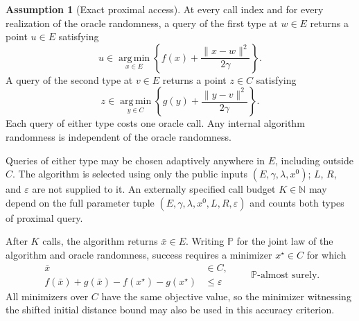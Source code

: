 \documentclass[10pt]{article}
\theoremstyle{definition}
\newtheorem{assumption}{Assumption}
\begin{document}
\begin{assumption}[Exact proximal access]
At every call index and for every realization of the oracle randomness, a query of the first type at $w\in E$ returns a point $u\in E$ satisfying
\[
u\in\operatorname*{arg\,min}_{x\in E}
\left\{f(x)+\frac{\|x-w\|^2}{2\gamma}\right\}.
\]
A query of the second type at $v\in E$ returns a point $z\in C$ satisfying
\[
z\in\operatorname*{arg\,min}_{y\in C}
\left\{g(y)+\frac{\|y-v\|^2}{2\gamma}\right\}.
\]
Each query of either type costs one oracle call. Any internal algorithm randomness is independent of the oracle randomness.
\end{assumption}

Queries of either type may be chosen adaptively anywhere in $E$, including outside $C$. The algorithm is selected using only the public inputs $(E,\gamma,\lambda,x^0)$; $L$, $R$, and $\varepsilon$ are not supplied to it. An externally specified call budget $K\in\mathbb{N}$ may depend on the full parameter tuple $(E,\gamma,\lambda,x^0,L,R,\varepsilon)$ and counts both types of proximal query.

After $K$ calls, the algorithm returns $\bar{x}\in E$. Writing $\mathbb{P}$ for the joint law of the algorithm and oracle randomness, success requires a minimizer $x^\star\in C$ for which
\[
\begin{aligned}
\bar{x}&\in C,\\
f(\bar{x})+g(\bar{x})-f(x^\star)-g(x^\star)&\leq\varepsilon
\end{aligned}
\qquad\mathbb{P}\text{-almost surely}.
\]
All minimizers over $C$ have the same objective value, so the minimizer witnessing the shifted initial distance bound may also be used in this accuracy criterion.
\end{document}
